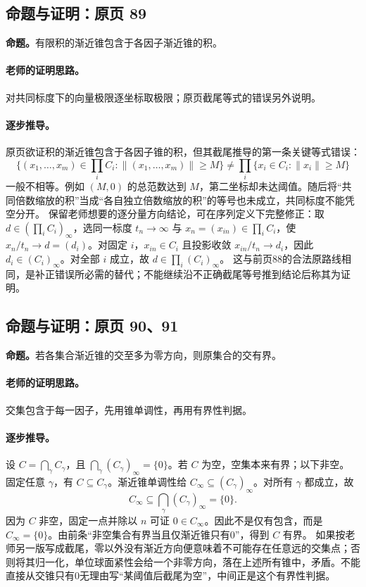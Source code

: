 \subsection{命题与证明：原页 89}

\textbf{命题。}有限积的渐近锥包含于各因子渐近锥的积。

\paragraph{老师的证明思路。}对共同标度下的向量极限逐坐标取极限；原页截尾等式的错误另外说明。

\paragraph{逐步推导。}
原页欲证积的渐近锥包含于各因子锥的积，但其截尾推导的第一条关键等式错误：
\[\{(x_1,\ldots,x_m)\in\prod_iC_i:\|(x_1,\ldots,x_m)\|\ge M\}\ne\prod_i\{x_i\in C_i:\|x_i\|\ge M\}\]
一般不相等。例如 $(M,0)$ 的总范数达到 $M$，第二坐标却未达阈值。随后将“共同倍数缩放的积”当成“各自独立倍数缩放的积”的等号也未成立，共同标度不能凭空分开。
保留老师想要的逐分量方向结论，可在序列定义下完整修正：取 $d\in(\prod_iC_i)_\infty$，选同一标度 $t_n\to\infty$ 与 $x_n=(x_{in})\in\prod_iC_i$，使 $x_n/t_n\to d=(d_i)$。对固定 $i$，$x_{in}\in C_i$ 且投影收敛 $x_{in}/t_n\to d_i$，因此 $d_i\in(C_i)_\infty$。对全部 $i$ 成立，故 $d\in\prod_i(C_i)_\infty$。
这与前页88的合法原路线相同，是补正错误所必需的替代；不能继续沿不正确截尾等号推到结论后称其为证明。


\subsection{命题与证明：原页 90、91}

\textbf{命题。}若各集合渐近锥的交至多为零方向，则原集合的交有界。

\paragraph{老师的证明思路。}交集包含于每一因子，先用锥单调性，再用有界性判据。

\paragraph{逐步推导。}
设 $C=\bigcap_\gamma C_\gamma$，且 $\bigcap_\gamma(C_\gamma)_\infty=\{0\}$。若 $C$ 为空，空集本来有界；以下非空。
固定任意 $\gamma$，有 $C\subseteq C_\gamma$。渐近锥单调性给 $C_\infty\subseteq(C_\gamma)_\infty$。对所有 $\gamma$ 都成立，故
\[C_\infty\subseteq\bigcap_\gamma(C_\gamma)_\infty=\{0\}.\]
因为 $C$ 非空，固定一点并除以 $n$ 可证 $0\in C_\infty$。因此不是仅有包含，而是 $C_\infty=\{0\}$。由前条“非空集合有界当且仅渐近锥只有0”，得到 $C$ 有界。
如果按老师另一版写成截尾，零以外没有渐近方向便意味着不可能存在任意远的交集点；否则将其归一化，单位球面紧性会给一个非零方向，落在上述所有锥中，矛盾。不能直接从交锥只有0无理由写“某阈值后截尾为空”，中间正是这个有界性判据。


